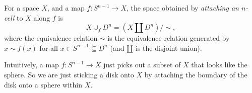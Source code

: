 \documentclass[a4paper]{article}
\begin{document}
\begin{defi}
  For a space $X$, and a map $f: S^{n - 1}\to X$, the space obtained by \emph{attaching an $n$-cell} to $X$ along $f$ is
  \[
    X\cup_{f}D^n = (X\amalg D^n)/{\sim},
  \]
  where the equivalence relation $\sim$ is the equivalence relation generated by $x\sim f(x)$ for all $x\in S^{n - 1}\subseteq D^n$ (and $\amalg$ is the disjoint union).

  Intuitively, a map $f: S^{n - 1}\to X$ just picks out a subset of $X$ that looks like the sphere. So we are just sticking a disk onto $X$ by attaching the boundary of the disk onto a sphere within $X$.
  \begin{center}
  \end{center}
\end{defi}
\end{document}
